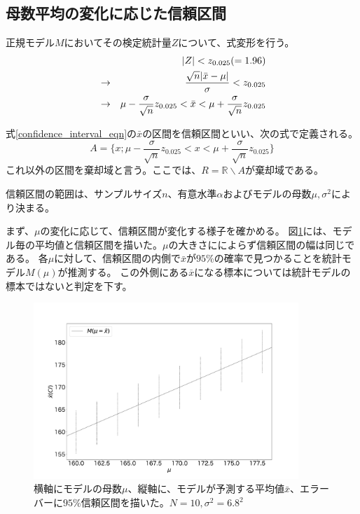 \subsection{母数平均の変化に応じた信頼区間}
正規モデル$M$においてその検定統計量$Z$について、式変形を行う。
\begin{eqnarray}
    & &|Z| < z_{0.025}( = 1.96 ) \notag \\
    &\rightarrow& \frac{\sqrt{n}|\bar{x}-\mu|}{\sigma} < z_{0.025} \notag\\
    &\rightarrow& \mu-\frac{\sigma}{\sqrt{n}}z_{0.025} < \bar{x} < \mu+\frac{\sigma}{\sqrt{n}}z_{0.025} \label{confidence_interval_eqn}
\end{eqnarray}

\begin{defi}
式\eqref{confidence_interval_eqn}の$\bar{x}$の区間を信頼区間といい、次の式で定義される。
\begin{equation*}
    A=\{x;\mu-\frac{\sigma}{\sqrt{n}}z_{0.025} < x < \mu+\frac{\sigma}{\sqrt{n}}z_{0.025} \}
\end{equation*}
これ以外の区間を棄却域と言う。ここでは、$R=\mathbb{R}\backslash A$が棄却域である。
\end{defi}
信頼区間の範囲は、サンプルサイズ$n$、有意水準$\alpha$およびモデルの母数$\mu,\sigma^2$により決まる。

まず、$\mu$の変化に応じて、信頼区間が変化する様子を確かめる。
図\ref{fig:confidence_interval_model}には、モデル毎の平均値と信頼区間を描いた。$\mu$の大きさにによらず信頼区間の幅は同じである。
各$\mu$に対して、信頼区間の内側で$\bar{x}$が$95\%$の確率で見つかることを統計モデル$M(\mu)$が推測する。
この外側にある$\bar{x}$になる標本については統計モデルの標本ではないと判定を下す。

\begin{figure}
    \begin{center}
        \includegraphics[width=10cm]{./image/04_/confidence_interval_model.pdf}
        \caption{横軸にモデルの母数$\mu$、縦軸に、モデルが予測する平均値$\bar{x}$、エラーバーに$95\%$信頼区間を描いた。$N=10,\sigma^2=6.8^2$}
        \label{fig:confidence_interval_model}

    \end{center}
\end{figure}



